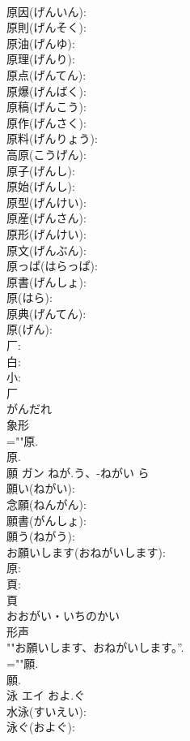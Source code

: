 \documentclass[8pt]{extreport}
\begin{document}
\begin{CJK}{UTF8}{min}
\\	原因(げんいん): 
\\	原則(げんそく): 
\\	原油(げんゆ): 
\\	原理(げんり): 
\\	原点(げんてん): 
\\	原爆(げんばく): 
\\	原稿(げんこう): 
\\	原作(げんさく): 
\\	原料(げんりょう): 
\\	高原(こうげん): 
\\	原子(げんし): 
\\	原始(げんし): 
\\	原型(げんけい): 
\\	原産(げんさん): 
\\	原形(げんけい): 
\\	原文(げんぶん): 
\\	原っぱ(はらっぱ): 
\\	原書(げんしょ): 
\\	原(はら): 
\\	原典(げんてん): 
\\	原(げん): 
\\	厂: 
\\	白: 
\\	小: 
\\	厂	
\\	がんだれ	
\\	象形 
\\	=""原.
\\	原.
\\	願	ガン	ねが.う、-ねがい	ら	
\\	願い(ねがい): 
\\	念願(ねんがん): 
\\	願書(がんしょ): 
\\	願う(ねがう): 
\\	お願いします(おねがいします): 
\\	原: 
\\	頁: 
\\	頁	
\\	おおがい・いちのかい	
\\	形声 
\\	""お願いします、おねがいします。”.
\\	=""願.
\\	願.
\\	泳	エイ	およ.ぐ		
\\	水泳(すいえい): 
\\	泳ぐ(およぐ): 

\end{CJK}
\end{document}
